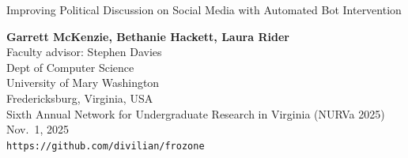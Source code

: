 \documentclass[12pt]{beamer}
\author{Mittereder, \textit{et. al.}}
\begin{document}
\begin{frame}[c]{}

\begin{center}
\Large

Improving Political Discussion on Social Media
with Automated Bot Intervention

\footnotesize
\textbf{Garrett McKenzie, Bethanie Hackett, Laura Rider}\\
\smallskip
\scriptsize
Faculty advisor: Stephen Davies \\
\medskip
Dept of Computer Science\\
University of Mary Washington\\
Fredericksburg, Virginia, USA\\
\bigskip
\bigskip
\scriptsize
Sixth Annual Network for Undergraduate Research in Virginia (NURVa 2025)\\
\bigskip
\scriptsize
Nov.~1, 2025\\
\texttt{https://github.com/divilian/frozone}
\end{center}

\end{frame}
\end{document}
